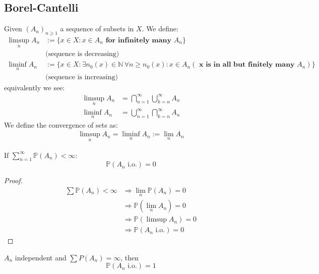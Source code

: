 \subsection{Borel-Cantelli}
\begin{definition}
	Given $(A_n)_{n \geq 1}$ a sequence of subsets in $X$. We define:
	\begin{align*}
		\limsup_n A_n &:= \{ x \in X: x \in A_n \textbf{ for infinitely many } A_n \}\\
		&\text{(sequence is decreasing)}\\
		\liminf_n A_n &:= \{ x \in X: \exists n_0(x) \in \mathbb{N}\,\forall n \geq n_0(x): x \in A_n ( \textbf{ x is in all but finitely many $A_n$})\}\\
		 &\text{(sequence is increasing)}
	\end{align*}
	equivalently we see:
	\begin{align*}
		\limsup_n A_n &= \bigcap_{n = 1}^\infty \bigcup_{k = n}^\infty A_n\\
		\liminf_n A_n &= \bigcup_{n = 1}^\infty \bigcap_{k = n}^\infty A_n
	\end{align*}
	We define the convergence of sets as:
	\begin{align*}
		\limsup_n A_n = \liminf_n A_n := \lim_n A_n
	\end{align*}
\end{definition}
\begin{theorem}
	If $\sum_{n = 1}^\infty \mathbb{P}(A_n) < \infty$:
	\begin{equation*}
		\mathbb{P}(A_n \text{ i.o.}) = 0
	\end{equation*}
\end{theorem}
\begin{proof}
\begin{align*}
	\sum \mathbb{P}(A_n) < \infty &\Rightarrow \lim_n \mathbb{P}(A_n) = 0\\
	&\Rightarrow \mathbb{P}(\lim_n A_n) = 0\\
	&\Rightarrow \mathbb{P}(\limsup A_n) = 0\\
	&\Rightarrow \mathbb{P}(A_n \text{ i.o.}) = 0
\end{align*}
\end{proof}

\begin{theorem}
	$A_n$ independent and $\sum P(A_n) = \infty$, then
	\begin{equation*}
		\mathbb{P}(A_n \text{ i.o.}) = 1
	\end{equation*}
\end{theorem}

